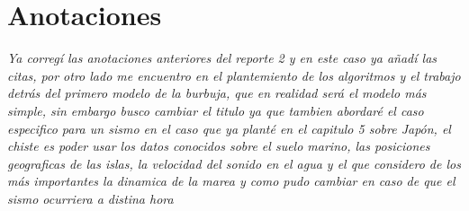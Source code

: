 \section{Anotaciones}


\textit{Ya corregí las anotaciones anteriores del reporte 2 y en este caso ya añadí las citas, por otro lado me encuentro en el plantemiento de los algoritmos y el trabajo detrás del primero modelo de la burbuja, que en realidad será el modelo más simple, sin embargo busco cambiar el titulo ya que tambien abordaré el caso especifico para un sismo en el caso que ya planté en el capitulo 5 sobre Japón, el chiste es poder usar los datos conocidos sobre el suelo marino, las posiciones geograficas de las islas, la velocidad del sonido en el agua y el que considero de los más importantes la dinamica de la marea y como pudo cambiar en caso de que el sismo ocurriera a distina hora}




